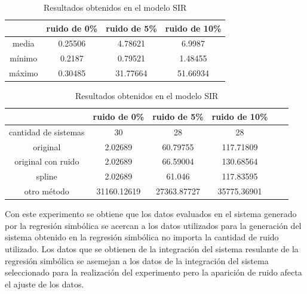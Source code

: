 \begin{table}[!h]
    \centering
    \caption{Resultados obtenidos en el modelo SIR}
    \begin{tabular}{|c|c|c|c|}
        \hline
               & \textbf{ruido de 0\%} & \textbf{ruido de 5\%} & \textbf{ruido de 10\%} \\
        \hline
        media  & 0.25506               & 4.78621               & 6.9987                 \\
        \hline
        mínimo & 0.2187                & 0.79521               & 1.48455                \\
        \hline
        máximo & 0.30485               & 31.77664              & 51.66934               \\
        \hline
    \end{tabular}

    \begin{tabular}{|c|c|c|c|c|c|}
        \hline
                             & \textbf{ruido de 0\%} & \textbf{ruido de 5\%} & \textbf{ruido de 10\%} \\
        \hline
        cantidad de sistemas & 30                    & 28                    & 28                     \\
        \hline
        original             & 2.02689               & 60.79755              & 117.71809              \\
        \hline
        original con ruido   & 2.02689               & 66.59004              & 130.68564              \\
        \hline
        spline               & 2.02689               & 61.046                & 117.83595              \\
        \hline
        otro método          & 31160.12619           & 27363.87727           & 35775.36901            \\
        \hline
    \end{tabular}
    \label{table:experiment_SIR}
\end{table}

Con este experimento se obtiene que los datos evaluados en el sistema generado por la regresión simbólica se acercan a los datos utilizados para la generación del sistema obtenido en la regresión simbólica no importa la cantidad de ruido utilizado. Los datos que se obtienen de la integración del sistema resulante de la regresión simbólica se asemejan a los datos de la integración del sistema seleccionado para la realización del experimento pero la aparición de ruido afecta el ajuste de los datos.

